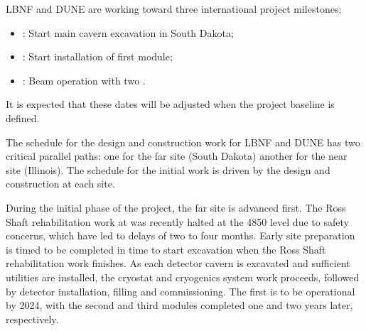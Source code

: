 LBNF and DUNE are working toward three international project milestones:
\begin{itemize}
\item \maincavernstartexc{}: Start main cavern excavation in South Dakota; %
\item \startfirsttpcinstall{}: Start installation of first  module; 
\item \beamturnon{}: Beam operation with two .
\end{itemize}
It is expected that these dates will be adjusted when the project baseline is defined. 


The schedule for the design and construction work for LBNF and DUNE has two critical parallel paths: one for the %
far site (South Dakota) %
another for the %
near site (Illinois). %
The schedule for the initial work is driven by the  design and construction at each site.

During the initial phase of the project, the far site  is advanced first. The Ross Shaft rehabilitation
work at \surf was recently halted at the 4850 level due to safety concerns, which have led to delays of two to four months. Early site preparation is timed to be completed 
in time to start excavation when the Ross Shaft rehabilitation work finishes. As each detector 
 cavern is excavated and sufficient utilities are installed, the cryostat and cryogenics system work proceeds, followed by detector installation, filling and commissioning. 
The first  is to be operational by 2024, with the second and third modules completed one and two years later, respectively.

